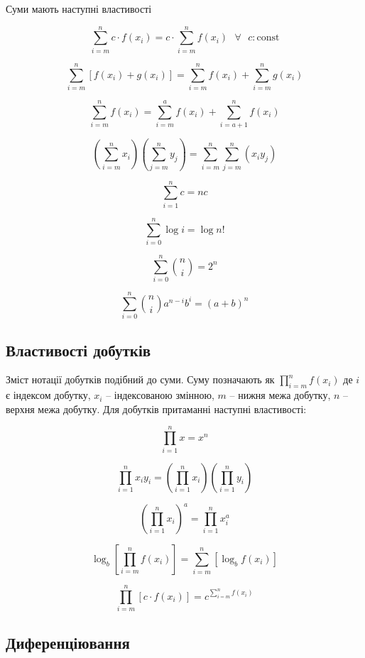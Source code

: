 \documentclass[
  11pt,
]{book}
\begin{document}
Суми мають наступні властивості

\[\sum\limits_{i=m}^{n}c\cdot f(x_i) = c \cdot \sum\limits_{i=m}^{n} f(x_i) \text{ } \forall \text{ } c : \text{const}\]

\[\sum\limits_{i=m}^{n} \left[ f(x_i) + g(x_i)\right] = \sum\limits_{i=m}^{n} f(x_i) + \sum\limits_{i=m}^{n} g(x_i)\]

\[\sum\limits_{i=m}^{n} f(x_i) = \sum\limits_{i=m}^{a} f(x_i) + \sum\limits_{i=a+1}^{n} f(x_i)\]

\[\left( \sum\limits_{i = m}^n x_i \right)\left( \sum\limits_{j = m}^n y_j \right) = \sum\limits_{i = m}^n \sum\limits_{j = m}^n (x_i y_j)\]

\[\sum \limits_{i=1}^n c = nc\]

\[\sum \limits_{i=0}^n \log i = \log n!\]

\[\sum \limits_{i=0}^n \binom{n}{i} = 2^n\]

\[\sum \limits_{i=0}^n \binom{n}{i} a^{n-i} b^i = (a+b)^n\]

\subsection{Властивості
добутків}\label{ux432ux43bux430ux441ux442ux438ux432ux43eux441ux442ux456-ux434ux43eux431ux443ux442ux43aux456ux432}

Зміст нотації добутків подібний до суми. Суму позначають як
\(\prod\limits_{i=m}^{n}f(x_i)\) де \(i\) є індексом добутку, \(x_i\) --
індексованою змінною, \(m\) -- нижня межа добутку, \(n\) -- верхня межа
добутку. Для добутків притаманні наступні властивості:

\[\prod\limits_{i=1}^n x = x^n\]

\[\prod\limits_{i=1}^n x_i y_i = \left( \prod\limits_{i=1}^n x_i\right)\left( \prod\limits_{i=1}^n y_i\right)\]

\[\left( \prod\limits_{i=1}^n x_i \right)^a = \prod\limits_{i=1}^n x_i^a\]

\[\log_b \left[ \prod\limits_{i = m}^n f(x_i) \right] = \sum\limits_{i=m}^n \left[ \log_b f(x_i) \right]\]

\[\prod\limits_{i = m}^n [c \cdot f(x_i)] = c^{\sum_{i=m}^n f(x_i)}\]

\subsection{Диференціювання}\label{ux434ux438ux444ux435ux440ux435ux43dux446ux456ux44eux432ux430ux43dux43dux44f}
\end{document}
